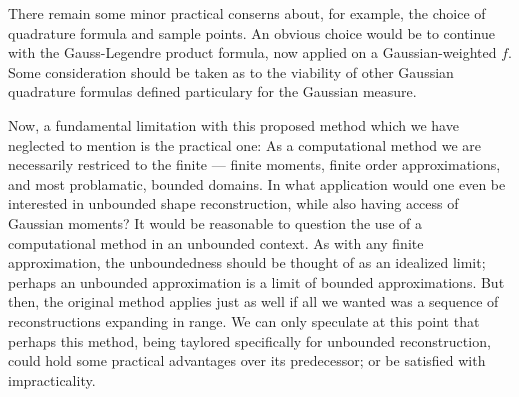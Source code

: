 \documentclass{amsart}
\theoremstyle{remark}
\numberwithin{equation}{section}
\newcommand{\RR}{\mathbb{R}}
\begin{document}
There remain some minor practical conserns about, for example, the choice of quadrature formula and sample points. An obvious choice would be to continue with the Gauss-Legendre product formula, now applied on a Gaussian-weighted $f$. Some consideration should be taken as to the viability of other Gaussian quadrature formulas defined particulary for the Gaussian measure. 

Now, a fundamental limitation with this proposed method which we have neglected to mention is the practical one: As a computational method we are necessarily restriced to the finite — finite moments, finite order approximations, and most problamatic, bounded domains. In what application would one even be interested in unbounded shape reconstruction, while also having access of Gaussian moments? It would be reasonable to question the use of a computational method in an unbounded context. As with any finite approximation, the unboundedness should be thought of as an idealized limit; perhaps an unbounded approximation is a limit of bounded approximations. But then, the original method applies just as well if all we wanted was a sequence of reconstructions expanding in range. We can only speculate at this point that perhaps this method, being taylored specifically for unbounded reconstruction, could hold some practical advantages over its predecessor; or be satisfied with impracticality.



\end{document}
